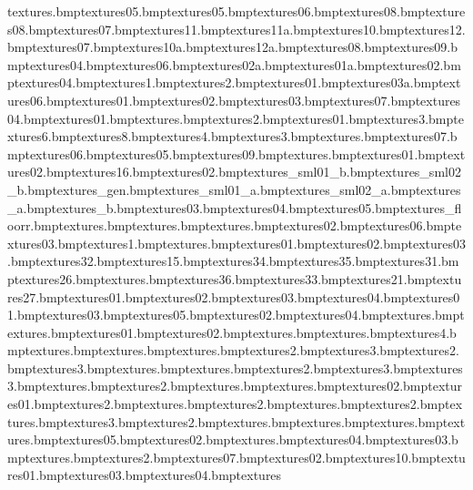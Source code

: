textures\snowtree.bmp textures\frozentreats05.bmp textures\sdomestrip05.bmp textures\snowdecal06.bmp textures\sdomestripi08.bmp textures\snowdecal08.bmp textures\snowdecal07.bmp textures\sdomestripi11.bmp textures\sdomestrip11a.bmp textures\sdomestripi10.bmp textures\sdomestripi12.bmp textures\sdomestrip07.bmp textures\sdomestrip10a.bmp textures\sdomestrip12a.bmp textures\sdomestrip08.bmp textures\sdomestrip09.bmp textures\sdomestrip04.bmp textures\sdomestrip06.bmp textures\sdomestrip02a.bmp textures\sdomestrip01a.bmp textures\sdomestrip02.bmp textures\sdomestripi04.bmp textures\iceplank1.bmp textures\iceplank2.bmp textures\sdomestripi01.bmp textures\sdomestrip03a.bmp textures\snowplank06.bmp textures\snowplank01.bmp textures\snowplank02.bmp textures\snowplank03.bmp textures\snowplank07.bmp textures\snowplank04.bmp textures\snowbarber01.bmp textures\frozentreats.bmp textures\frozentreats2.bmp textures\sdomestrip01.bmp textures\iceplank3.bmp textures\iceplank6.bmp textures\iceplank8.bmp textures\iceplank4.bmp textures\fence3.bmp textures\snowblanket.bmp textures\sdomestripi07.bmp textures\sdomestripi06.bmp textures\sdomestripi05.bmp textures\sdomestripi09.bmp textures\postbox.bmp textures\wanted01.bmp textures\wanted02.bmp textures\wpaper16.bmp textures\cablecar02.bmp textures\cablecar_sml01_b.bmp textures\cablecar_sml02_b.bmp textures\cablecar_gen.bmp textures\cablecar_sml01_a.bmp textures\cablecar_sml02_a.bmp textures\cablecar_a.bmp textures\cablecar_b.bmp textures\cablecar03.bmp textures\cablecar04.bmp textures\cablecar05.bmp textures\cablecar_floorr.bmp textures\snowtile.bmp textures\browtreebig.bmp textures\treeend.bmp textures\bluhut02.bmp textures\bluhutwin06.bmp textures\bluhutwin03.bmp textures\wbridge1.bmp textures\rocketstripes.bmp textures\snowpole01.bmp textures\snowpole02.bmp textures\snowpole03.bmp textures\sign32.bmp textures\sign15.bmp textures\sign34.bmp textures\sign35.bmp textures\sign31.bmp textures\sign26.bmp textures\snow.bmp textures\sign36.bmp textures\sign33.bmp textures\sign21.bmp textures\sign27.bmp textures\igloo01.bmp textures\igloo02.bmp textures\igloo03.bmp textures\frozentreats04.bmp textures\sub01.bmp textures\sub03.bmp textures\sub05.bmp textures\sub02.bmp textures\sub04.bmp textures\burgbun.bmp textures\burgtom.bmp textures\taztop01.bmp textures\taztop02.bmp textures\burgmeat.bmp textures\cake.bmp textures\hamper4.bmp textures\hamper.bmp textures\hamplid.bmp textures\hampfood.bmp textures\hampfod2.bmp textures\hampfod3.bmp textures\hamper2.bmp textures\hamper3.bmp textures\happymeal.bmp textures\slurp.bmp textures\slurp2.bmp textures\slurp3.bmp textures\fries3.bmp textures\fries.bmp textures\fries2.bmp textures\hotdog.bmp textures\chocblu.bmp textures\choc02.bmp textures\choc01.bmp textures\chocwap2.bmp textures\chocwap.bmp textures\icewafe2.bmp textures\icewafer.bmp textures\iceloll2.bmp textures\icelolly.bmp textures\iceloll3.bmp textures\milk2.bmp textures\milk.bmp textures\can.bmp textures\canhole.bmp textures\rocketlogo.bmp textures\phone05.bmp textures\phone02.bmp textures\phone.bmp textures\phone04.bmp textures\phone03.bmp textures\bigpizza.bmp textures\bigpizza2.bmp textures\snowindow07.bmp textures\snowindow02.bmp textures\snowindow10.bmp textures\snowindow01.bmp textures\snowindow03.bmp textures\snowindow04.bmp textures